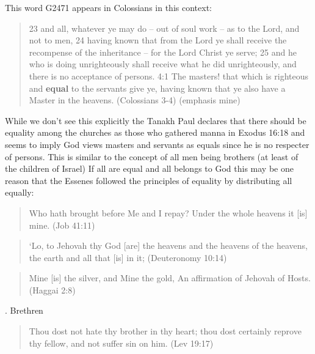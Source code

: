 \documentclass[11pt]{article}
\begin{document}
\noindent\noindent This word G2471 appears in Colossians in this context:
\begin{quote}
23 and all, whatever ye may do -- out of soul work -- as to the Lord, and not to men,
24 having known that from the Lord ye shall receive the recompense of the inheritance -- for the Lord Christ ye serve;
25 and he who is doing unrighteously shall receive what he did unrighteously, and there is no acceptance of persons.
4:1 The masters! that which is righteous and \textbf{equal} to the servants give ye, having known that ye also have a Master in the heavens.
(Colossians 3-4) (emphasis mine)
\end{quote} 
While we don't see this explicitly the Tanakh Paul declares that there should be equality among the churches as those who gathered manna in Exodus 16:18 and seems to imply God views masters and servants as equals since he is no respecter of persons. This is similar to the concept of all men being brothers (at least of the children of Israel) If all are equal and all belongs to God this may be one reason that the Essenes followed the principles of equality by distributing all equally:
\begin{quote}
Who hath brought before Me and I repay? Under the whole heavens it [is] mine. (Job 41:11)
\end{quote}
\begin{quote}
`Lo, to Jehovah thy God [are] the heavens and the heavens of the heavens, the earth and all that [is] in it; (Deuteronomy 10:14)
\end{quote}
\begin{quote}
Mine [is] the silver, and Mine the gold, An affirmation of Jehovah of Hosts.
(Haggai 2:8)
\end{quote}


. Brethren
\begin{quote}
Thou dost not hate thy brother in thy heart; thou dost certainly reprove thy fellow, and not suffer sin on him. (Lev 19:17)
\end{quote}
\end{document}

